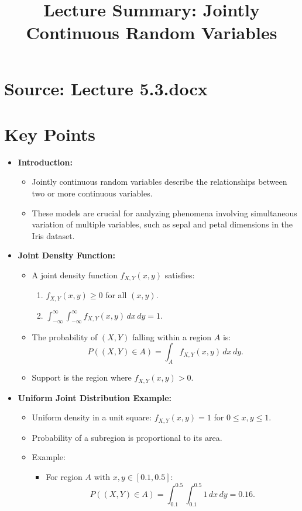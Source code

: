 \documentclass{article}
\title{Lecture Summary: Jointly Continuous Random Variables}
\author{}
\date{}
\begin{document}
\maketitle

\section*{Source: Lecture 5.3.docx}

\section*{Key Points}

\begin{itemize}
  \item \textbf{Introduction:}
    \begin{itemize}
      \item Jointly continuous random variables describe the relationships between two or more continuous variables.
      \item These models are crucial for analyzing phenomena involving simultaneous variation of multiple variables, such as sepal and petal dimensions in the Iris dataset.
    \end{itemize}

  \item \textbf{Joint Density Function:}
    \begin{itemize}
      \item A joint density function $f_{X,Y}(x,y)$ satisfies:
        \begin{enumerate}
          \item $f_{X,Y}(x,y) \geq 0$ for all $(x, y)$.
          \item $\int_{-\infty}^\infty \int_{-\infty}^\infty f_{X,Y}(x,y) \, dx \, dy = 1$.
        \end{enumerate}
      \item The probability of $(X, Y)$ falling within a region $A$ is:
        \[
          P((X, Y) \in A) = \int_A f_{X,Y}(x,y) \, dx \, dy.
        \]
      \item Support is the region where $f_{X,Y}(x,y) > 0$.
    \end{itemize}

  \item \textbf{Uniform Joint Distribution Example:}
    \begin{itemize}
      \item Uniform density in a unit square: $f_{X,Y}(x,y) = 1$ for $0 \leq x, y \leq 1$.
      \item Probability of a subregion is proportional to its area.
      \item Example:
        \begin{itemize}
          \item For region $A$ with $x, y \in [0.1, 0.5]$:
            \[
              P((X, Y) \in A) = \int_{0.1}^{0.5} \int_{0.1}^{0.5} 1 \, dx \, dy = 0.16.
            \]
        \end{itemize}
    \end{itemize}


\end{itemize}
\end{document}
